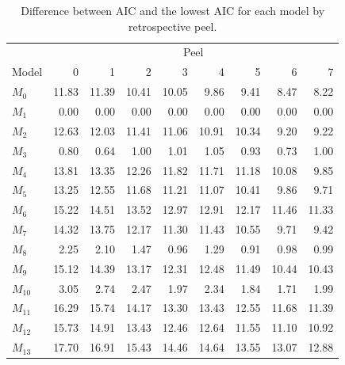 \documentclass[
]{article}
\begin{document}
\begin{table}

\caption{\label{tab:diff-aic-table}Difference between AIC and the lowest AIC for each model by retrospective peel.}
\centering
\begin{tabular}[t]{lrrrrrrrr}
\toprule
\multicolumn{1}{c}{ } & \multicolumn{8}{c}{Peel} \\
\cmidrule(l{3pt}r{3pt}){2-9}
Model & 0 & 1 & 2 & 3 & 4 & 5 & 6 & 7\\
\midrule
$M_{0}$ & 11.83 & 11.39 & 10.41 & 10.05 & 9.86 & 9.41 & 8.47 & 8.22\\
$M_{1}$ & 0.00 & 0.00 & 0.00 & 0.00 & 0.00 & 0.00 & 0.00 & 0.00\\
$M_{2}$ & 12.63 & 12.03 & 11.41 & 11.06 & 10.91 & 10.34 & 9.20 & 9.22\\
$M_{3}$ & 0.80 & 0.64 & 1.00 & 1.01 & 1.05 & 0.93 & 0.73 & 1.00\\
$M_{4}$ & 13.81 & 13.35 & 12.26 & 11.82 & 11.71 & 11.18 & 10.08 & 9.85\\
\addlinespace
$M_{5}$ & 13.25 & 12.55 & 11.68 & 11.21 & 11.07 & 10.41 & 9.86 & 9.71\\
$M_{6}$ & 15.22 & 14.51 & 13.52 & 12.97 & 12.91 & 12.17 & 11.46 & 11.33\\
$M_{7}$ & 14.32 & 13.75 & 12.17 & 11.30 & 11.43 & 10.55 & 9.71 & 9.42\\
$M_{8}$ & 2.25 & 2.10 & 1.47 & 0.96 & 1.29 & 0.91 & 0.98 & 0.99\\
$M_{9}$ & 15.12 & 14.39 & 13.17 & 12.31 & 12.48 & 11.49 & 10.44 & 10.43\\
\addlinespace
$M_{10}$ & 3.05 & 2.74 & 2.47 & 1.97 & 2.34 & 1.84 & 1.71 & 1.99\\
$M_{11}$ & 16.29 & 15.74 & 14.17 & 13.30 & 13.43 & 12.55 & 11.68 & 11.39\\
$M_{12}$ & 15.73 & 14.91 & 13.43 & 12.46 & 12.64 & 11.55 & 11.10 & 10.92\\
$M_{13}$ & 17.70 & 16.91 & 15.43 & 14.46 & 14.64 & 13.55 & 13.07 & 12.88\\
\bottomrule
\end{tabular}
\end{table}
\end{document}
